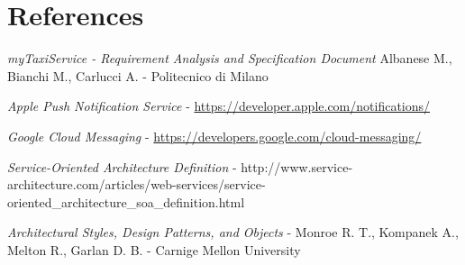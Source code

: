 \pagebreak
\section{References}
\begin{thebibliography}{9}

    \emph{myTaxiService - Requirement Analysis and Specification Document}
    Albanese M., Bianchi M., Carlucci A. - Politecnico di Milano

    \emph{Apple Push Notification Service} -
    \url{https://developer.apple.com/notifications/}

    \emph{Google Cloud Messaging} - 
    \url{https://developers.google.com/cloud-messaging/}

    \emph{Service-Oriented Architecture Definition} - 
    http://www.service-architecture.com/articles/web-services/service-oriented_architecture_soa_definition.html

    \emph{Architectural Styles, Design Patterns, and Objects} - 
    Monroe R. T., Kompanek A., Melton R., Garlan D. B. - 
    Carnige Mellon University

\end{thebibliography}

